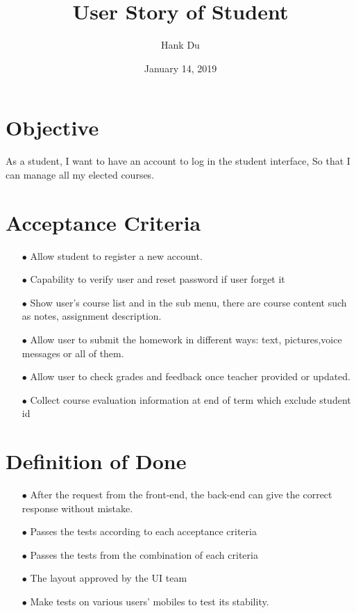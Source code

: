 \documentclass{article}
\begin{document}
\title{User Story of Student}
\author{Hank Du}
\date{January 14, 2019}
\maketitle
\section*{Objective}
As a student, I want to have an account to log in the student interface, So that I can manage all my elected courses.

\section*{Acceptance Criteria}
\begin{itemize}
\item[$\bullet$] Allow student to register a new account.
\item[$\bullet$] Capability to verify user and reset password if user forget it
\item[$\bullet$] Show user's course list and in the sub menu, there are course content such as notes, assignment description. 
\item[$\bullet$] Allow user to submit the homework in different ways: text, pictures,voice messages or all of them.
\item[$\bullet$] Allow user to check grades and feedback once teacher provided or updated.
\item[$\bullet$] Collect course evaluation information at end of term which exclude student id 
\end{itemize}

\section*{Definition of Done}
\begin{itemize}
\item[$\bullet$] After the request from the front-end, the back-end can give the correct response without mistake.
\item[$\bullet$] Passes the tests according to each acceptance criteria
\item[$\bullet$] Passes the tests from the combination of each criteria
\item[$\bullet$] The layout approved by the UI team
\item[$\bullet$] Make tests on various users' mobiles to test its stability.
\end{itemize}
\end{document}
